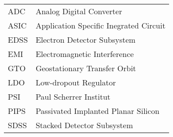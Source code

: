\begin{center}
\begin{tabular}{p{2cm}p{8cm}}
	ADC & Analog Digital Converter \\
	ASIC & Application Specific Inegrated Circuit \\
	EDSS & Electron Detector Subsystem \\
	EMI & Electromagnetic Interference \\
	GTO & Geostationary Transfer Orbit \\
	LDO & Low-dropout Regulator \\
	PSI & Paul Scherrer Institut \\
	PIPS & Passivated Implanted Planar Silicon \\
	SDSS & Stacked Detector Subsystem \\
\end{tabular}
\end{center}
